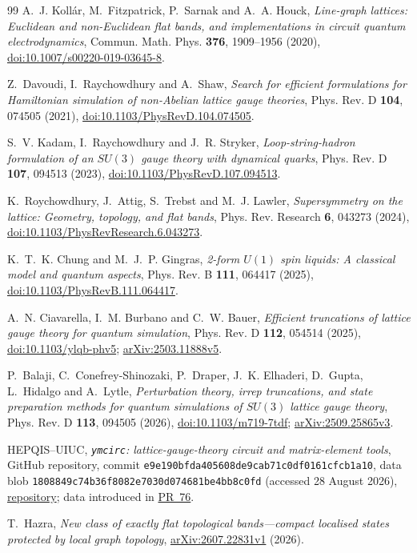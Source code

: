 \documentclass[11pt]{article}
\theoremstyle{plain}
\theoremstyle{definition}
\theoremstyle{remark}
\begin{document}
\begin{thebibliography}{99}
 A.~J. Koll\'ar, M.~Fitzpatrick, P.~Sarnak and A.~A. Houck,
  \emph{Line-graph lattices: Euclidean and non-Euclidean flat bands, and
  implementations in circuit quantum electrodynamics}, Commun. Math. Phys.
  \textbf{376}, 1909--1956 (2020),
  \href{https://doi.org/10.1007/s00220-019-03645-8}{doi:10.1007/s00220-019-03645-8}.

 Z.~Davoudi, I.~Raychowdhury and A.~Shaw,
  \emph{Search for efficient formulations for Hamiltonian simulation of
  non-Abelian lattice gauge theories}, Phys. Rev. D \textbf{104}, 074505
  (2021), \href{https://doi.org/10.1103/PhysRevD.104.074505}{doi:10.1103/PhysRevD.104.074505}.

 S.~V. Kadam, I.~Raychowdhury and J.~R. Stryker,
  \emph{Loop-string-hadron formulation of an $SU(3)$ gauge theory with
  dynamical quarks}, Phys. Rev. D \textbf{107}, 094513 (2023),
  \href{https://doi.org/10.1103/PhysRevD.107.094513}{doi:10.1103/PhysRevD.107.094513}.

 K.~Roychowdhury, J.~Attig, S.~Trebst and
  M.~J. Lawler, \emph{Supersymmetry on the lattice: Geometry, topology, and
  flat bands}, Phys. Rev. Research \textbf{6}, 043273 (2024),
  \href{https://doi.org/10.1103/PhysRevResearch.6.043273}{doi:10.1103/PhysRevResearch.6.043273}.

 K.~T.~K. Chung and M.~J.~P. Gingras,
  \emph{2-form $U(1)$ spin liquids: A classical model and quantum aspects},
  Phys. Rev. B \textbf{111}, 064417 (2025),
  \href{https://doi.org/10.1103/PhysRevB.111.064417}{doi:10.1103/PhysRevB.111.064417}.

 A.~N. Ciavarella, I.~M. Burbano and C.~W. Bauer,
  \emph{Efficient truncations of lattice gauge theory for quantum simulation},
  Phys. Rev. D \textbf{112}, 054514 (2025),
  \href{https://doi.org/10.1103/ylqb-phv5}{doi:10.1103/ylqb-phv5};
  \href{https://arxiv.org/abs/2503.11888}{arXiv:2503.11888v5}.

 P.~Balaji, C.~Conefrey-Shinozaki, P.~Draper,
  J.~K. Elhaderi, D.~Gupta, L.~Hidalgo and A.~Lytle,
  \emph{Perturbation theory, irrep truncations, and state preparation methods
  for quantum simulations of $SU(3)$ lattice gauge theory}, Phys. Rev. D
  \textbf{113}, 094505 (2026),
  \href{https://doi.org/10.1103/m719-7tdf}{doi:10.1103/m719-7tdf};
  \href{https://arxiv.org/abs/2509.25865}{arXiv:2509.25865v3}.

 HEPQIS--UIUC,
  \emph{\texttt{ymcirc}: lattice-gauge-theory circuit and matrix-element
  tools}, GitHub repository, commit
  \nolinkurl{e9e190bfda405608de9cab71c0df0161cfcb1a10}, data blob
  \nolinkurl{1808849c74b36f8082e7030d074681be4bb8c0fd} (accessed 28 August
  2026), \href{https://github.com/hepqis-uiuc/ymcirc}{repository};
  data introduced in \href{https://github.com/hepqis-uiuc/ymcirc/pull/76}{PR~76}.

 T.~Hazra,
  \emph{New class of exactly flat topological bands---compact localised states
  protected by local graph topology},
  \href{https://arxiv.org/abs/2607.22831}{arXiv:2607.22831v1} (2026).

\end{thebibliography}
\end{document}
